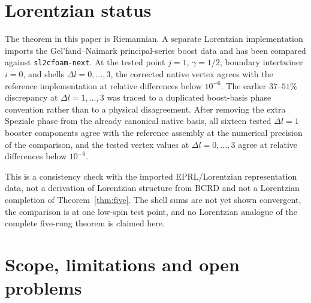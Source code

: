 \documentclass[11pt]{article}
\numberwithin{equation}{section}
\begin{document}
\section{Lorentzian status}

The theorem in this paper is Riemannian. A separate Lorentzian implementation imports the Gel'fand--Naimark principal-series boost data and has been compared against \texttt{sl2cfoam-next}. At the tested point $j=1$, $\gamma=1/2$, boundary intertwiner $i=0$, and shells $\Delta l=0,\ldots,3$, the corrected native vertex agrees with the reference implementation at relative differences below $10^{-6}$. The earlier $37$--$51\%$ discrepancy at $\Delta l=1,\ldots,3$ was traced to a duplicated boost-basis phase convention rather than to a physical disagreement. After removing the extra Speziale phase from the already canonical native basis, all sixteen tested $\Delta l=1$ booster components agree with the reference assembly at the numerical precision of the comparison, and the tested vertex values at $\Delta l=0,\ldots,3$ agree at relative differences below $10^{-6}$.

This is a consistency check with the imported EPRL/Lorentzian representation data, not a derivation of Lorentzian structure from BCRD and not a Lorentzian completion of Theorem~\ref{thm:five}. The shell sums are not yet shown convergent, the comparison is at one low-spin test point, and no Lorentzian analogue of the complete five-rung theorem is claimed here.

\section{Scope, limitations and open problems}
\end{document}
